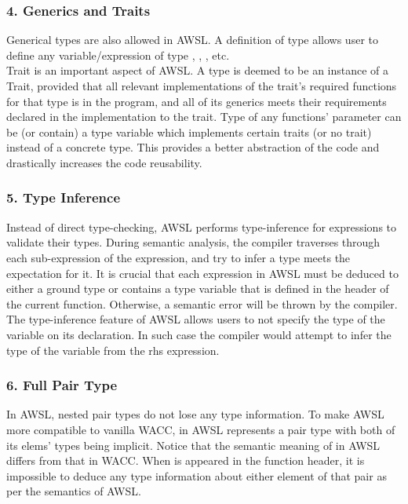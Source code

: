 \documentclass[10pt,a4paper]{report}
\begin{document}
  \subsubsection*{4. Generics and Traits}
  Generical types are also allowed in AWSL. A definition of type  allows user to define any variable/expression 
  of type , , , etc.\\
  Trait is an important aspect of AWSL. A type is deemed to be an instance of a Trait, provided that all relevant implementations of
  the trait's required functions for that type is in the program, and all of its generics meets their requirements declared
  in the implementation to the trait. Type of any functions' parameter can be (or contain) a type variable 
  which implements certain traits (or no trait) instead of a concrete type. This provides a better abstraction of the code and 
  drastically increases the code reusability. 

  \subsubsection*{5. Type Inference}
  Instead of direct type-checking, AWSL performs type-inference for expressions to validate their types. During semantic analysis, the
  compiler traverses through each sub-expression of the expression, and try to infer a type meets the expectation for it. 
  It is crucial that each expression in AWSL must be deduced to either a ground type or contains a type variable that is defined in the 
  header of the current function. Otherwise, a semantic error will be thrown by the compiler.\\
  The type-inference feature of AWSL allows users to not specify the type of the variable on its declaration. In such case the compiler would 
  attempt to infer the type of the variable from the rhs expression.

  \subsubsection*{6. Full Pair Type}
  In AWSL, nested pair types do not lose any type information. To make AWSL more compatible to vanilla WACC,  in AWSL represents
  a pair type with both of its elems' types being implicit. Notice that the semantic meaning of  in AWSL differs from that in WACC. 
  When  is appeared in the function header, it is impossible to deduce any type information about either element of that pair as 
  per the semantics of AWSL.
\end{document}
